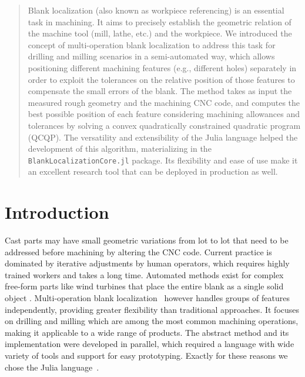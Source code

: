 \documentclass{juliacon}
\begin{document}


\maketitle

\begin{abstract}

Blank localization (also known as workpiece referencing) is an essential task in machining.
It aims to precisely establish the geometric relation of the machine tool (mill, lathe, etc.) and the workpiece.
We introduced the concept of multi-operation blank localization to address this task for drilling and milling scenarios in a semi-automated way,
which allows positioning different machining features (e.g., different holes) separately in order to exploit the tolerances on the relative position of those features to compensate the small errors of the blank.
The method takes as input the measured rough geometry and the machining CNC code, and computes the best possible position of each feature considering machining allowances and tolerances by solving a convex quadratically constrained quadratic program (QCQP).
The versatility and extensibility of the Julia language helped the development of this algorithm, materializing in the \texttt{BlankLocalizationCore.jl} package.
Its flexibility and ease of use make it an excellent research tool that can be deployed in production as well.
\end{abstract}

\section{Introduction}
\label{sec:intro}
Cast parts may have small geometric variations from lot to lot that need to be addressed before machining by altering the CNC code.
Current practice is dominated by iterative adjustments by human operators, which requires highly trained workers and takes a long time.
Automated methods exist for complex free-form parts like wind turbines that place the entire blank as a single solid object \cite{tan:2014_UnconstrainedApproachBlank}.
Multi-operation blank localization~\cite{cserteg:2023_Annals} however handles groups of features independently, providing greater flexibility than traditional approaches.
It focuses on drilling and milling which are among the most common machining operations, making it applicable to a wide range of products.
The abstract method and its implementation were developed in parallel, which required a language with wide variety of tools and support for easy prototyping.
Exactly for these reasons we chose the Julia language~\cite{bezanson2017julia}.
\end{document}
